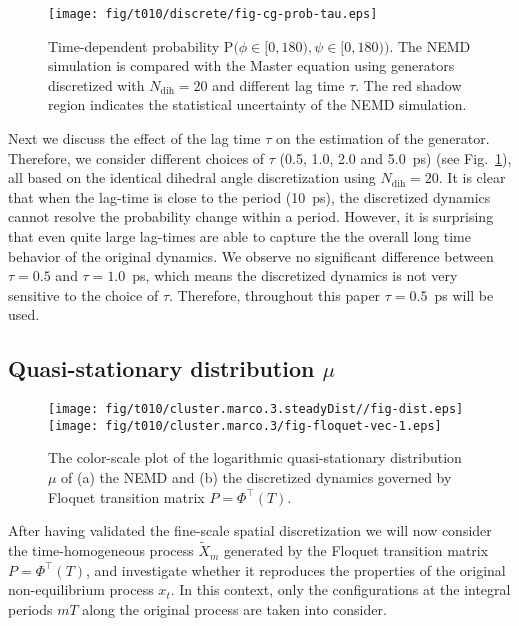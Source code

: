 \documentclass[aps, pre, preprint,unsortedaddress,a4paper,onecolumn,showkeys]{revtex4}
\newcommand{\vect}[1]{#1}
\newcommand{\myphi}{\Phi}
\newcommand{\mymu}{\mu}
\newcommand{\prob}{\textrm{P}}
\newcommand{\dih}{\textrm{dih}}
\begin{document}
\begin{figure}
  \centering
  \texttt{[image: fig/t010/discrete/fig-cg-prob-tau.eps]}  
  \caption{Time-dependent probability $\prob\big(\phi\in[0,180), \psi\in [0,180)\big)$.  The NEMD simulation is compared with the Master equation using generators discretized with $N_\dih=20$ and different lag time $\tau$. The red shadow region indicates the
    statistical uncertainty of the NEMD simulation.}
  \label{fig:tmp3}
\end{figure}

Next we discuss the effect of the lag time $\tau$ on the estimation of the generator. Therefore, we consider 
different choices of $\tau$ (0.5, 1.0, 2.0 and 5.0~ps)
(see Fig.~\ref{fig:tmp3}), all based on the identical dihedral angle discretization using $N_\dih=20$.
It is clear that when the lag-time is close to the period (10~ps), the
discretized dynamics cannot resolve the probability change within a
period. However, it is surprising  that even quite large lag-times are able to capture the
the overall long time behavior of the original dynamics.
We observe no significant difference between $\tau=0.5$ and
$\tau=1.0$~ps, which means the discretized dynamics is not very sensitive
to the choice of $\tau$.
Therefore, throughout this paper $\tau=0.5$~ps will be used.



\subsection{Quasi-stationary distribution $\mymu$}


\begin{figure}
  \centering  
  \texttt{[image: fig/t010/cluster.marco.3.steadyDist//fig-dist.eps]}\\
  \texttt{[image: fig/t010/cluster.marco.3/fig-floquet-vec-1.eps]}
  \caption{The color-scale plot of the logarithmic quasi-stationary distribution $\mymu$
    of (a) the NEMD  and (b)
    the discretized dynamics governed by Floquet transition matrix $\vect P=\myphi^{\top}(T)$.
  }
  \label{fig:num-1}
\end{figure}

After having validated the fine-scale spatial discretization 
we will now consider the time-homogeneous process $\tilde X_{m}$ generated by
the Floquet transition matrix $P = \Phi^{\top}(T)$, and investigate whether it
reproduces the properties of the original  non-equilibrium process $x_t$.
In this context, only the configurations at the  integral periods $mT$ along the original process
are taken into consider.
\end{document}
